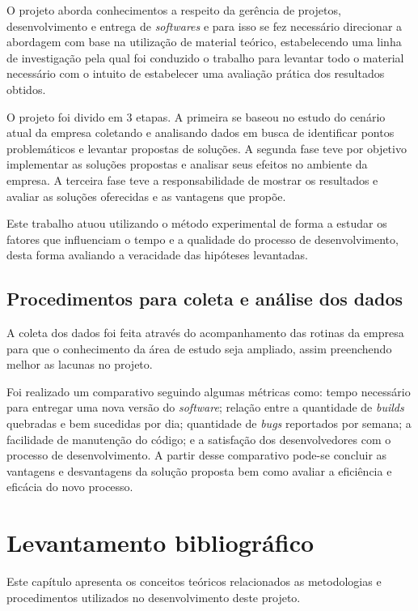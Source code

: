 \documentclass[
12pt,				%
openright,			%
oneside,			%
a4paper,			%
english,			%
french,				%
spanish,			%
brazil,				%
]{abntex2}
\begin{document}
O projeto aborda conhecimentos a respeito da gerência de projetos, desenvolvimento e entrega de \textit{softwares} e para isso se fez necessário direcionar a abordagem com base na utilização de material teórico, estabelecendo uma linha de investigação pela qual foi conduzido o trabalho para levantar todo o material necessário com o intuito de estabelecer uma avaliação prática dos resultados obtidos.

O projeto foi divido em 3 etapas. A primeira se baseou no estudo do cenário atual da empresa coletando e analisando dados em busca de identificar pontos problemáticos e levantar propostas de soluções. A segunda fase teve por objetivo implementar as soluções propostas e analisar seus efeitos no ambiente da empresa. A terceira fase teve a responsabilidade de mostrar os resultados e avaliar as soluções oferecidas e as vantagens que propõe.

Este trabalho atuou utilizando o método experimental de forma a estudar os fatores que influenciam o tempo e a qualidade do processo de desenvolvimento, desta forma avaliando a veracidade das hipóteses levantadas.

\section{Procedimentos para coleta e análise dos dados}

A coleta dos dados foi feita através do acompanhamento das rotinas da empresa para que o conhecimento da área de estudo seja ampliado, assim preenchendo melhor as lacunas no projeto.

Foi realizado um comparativo seguindo algumas métricas como: tempo necessário para entregar uma nova versão do \textit{software}; relação entre a quantidade de \textit{builds} quebradas e bem sucedidas por dia; quantidade de \textit{bugs} reportados por semana; a facilidade de manutenção do código; e a satisfação dos desenvolvedores com o processo de desenvolvimento. A partir desse comparativo pode-se concluir as vantagens e desvantagens da solução proposta bem como avaliar a eficiência e eficácia do novo processo.

\chapter{Levantamento bibliográfico}

Este capítulo apresenta os conceitos teóricos relacionados as metodologias e procedimentos utilizados no desenvolvimento deste projeto.
\end{document}
